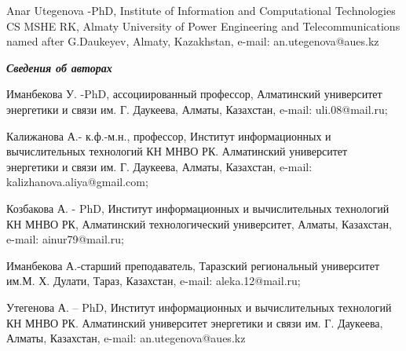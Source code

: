 Anar Utegenova -PhD, Institute of Information and Computational
Technologies CS MSHE RK, Almaty University of Power Engineering and
Telecommunications named after G.Daukeyev, Almaty, Kazakhstan, e-mail:
an.utegenova@aues.kz

\emph{\textbf{Сведения об авторах}}

Иманбекова У. -PhD, ассоциированный профессор, Алматинский университет
энергетики и связи им. Г. Даукеева, Алматы, Казахстан, e-mail:
uli.08@mail.ru;

Калижанова А.- к.ф.-м.н., профессор, Институт информационных и
вычислительных технологий КН МНВО РК. Алматинский университет энергетики
и связи им. Г. Даукеева, Алматы, Казахстан, e-mail:
kalizhanova.aliya@gmail.com;

Козбакова А. - PhD, Институт информационных и вычислительных технологий
КН МНВО РК, Алматинский технологический университет, Алматы, Казахстан,
e-mail: ainur79@mail.ru;

Иманбекова А.-старший преподаватель, Таразский региональный университет
им.М. Х. Дулати, Тараз, Казахстан, e-mail: aleka.12@mail.ru;

Утегенова А. -- PhD, Институт информационных и вычислительных технологий
КН МНВО РК. Алматинский университет энергетики и связи им. Г. Даукеева,
Алматы, Казахстан, e-mail: an.utegenova@aues.kz
